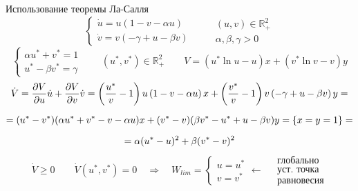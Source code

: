 	
	\begin{example}Использование теоремы Ла-Салля
		$$			
			\begin{cases}
				\dot{u} = u(1- v -\alpha u) \\
				\dot{v} = v(-\gamma + u -\beta v) 
			\end{cases} \qquad \begin{gathered} (u,v) \in \mathbb{R}^2_+ \\ \alpha, \beta, \gamma > 0\end{gathered}
		$$
		$$
			\begin{cases}
				 \alpha u^* + v^* =1 \\
				 u^* - \beta v^* = \gamma 
			\end{cases} \qquad  (u^*,v^*) \in \mathbb{R}^2_+ \qquad V = (u^*\ln u- u )x + (v^*\ln v - v) y
		$$
		$$
			\begin{gathered}
				\dot{V} = \dfrac{\partial V}{\partial u} \dot{u} + \dfrac{\partial V}{\partial v} \dot{v} = 
					\left( \dfrac{u^*}{v} -1 \right) u \left(1-v-\alpha u\right)x + 
					\left( \dfrac{v^*}{v} -1 \right) v \left(-\gamma+u-\beta v \right)y = \vspace{2mm} \\
					= (u^* -v^*)(\alpha u^* + v^* -v -\alpha u)x + (v^*-v)(\beta v^* - u^* +u-\beta v)y =
																															 \{x=y=1\} =  \vspace{2mm} \\
					= \alpha(u^*-u)^2+ \beta(v^*-v)^2
			\end{gathered}
		$$	
		$$
			\dot{V} \geqslant 0 \qquad \dot{V}(u^*,v^*) = 0 \quad \Rightarrow \quad W_{lim} = 
						\begin{cases}
							u =u^* \\
							v = v^*
						\end{cases} \leftarrow \quad \begin{gathered} \text{глобально} \\
																					 	\text{уст. точка} \\
																						  \text{равновесия}	 
															\end{gathered}
 		$$
	\end{example}

